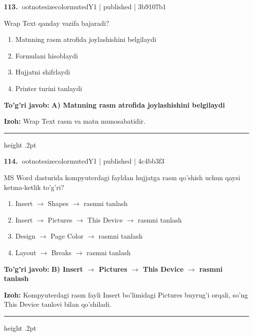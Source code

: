 \documentclass[10pt,a4paper]{article}
\begin{document}
\textbf{\color{ink}113.} {ootnotesizecolor{muted}Y1 | published | 3b9107b1}
\par
Wrap Text qanday vazifa bajaradi?
\begin{enumerate}[label=\Alph*),leftmargin=9mm]
\item Matnning rasm atrofida joylashishini belgilaydi
\item Formulani hisoblaydi
\item Hujjatni shifrlaydi
\item Printer turini tanlaydi
\end{enumerate}
\begin{tcolorbox}[enhanced,breakable,colback=teal!4,colframe=teal!55!black,boxrule=0.45pt,arc=1.2mm,left=2.8mm,right=2.8mm,top=2mm,bottom=2mm]
\textbf{\color{teal}To'g'ri javob:} \textbf{A) Matnning rasm atrofida joylashishini belgilaydi}
\par\smallskip
\textbf{Izoh:} Wrap Text rasm va matn munosabatidir.
\end{tcolorbox}
\vspace{2mm}\hrule height .2pt\vspace{2mm}

\textbf{\color{ink}114.} {ootnotesizecolor{muted}Y1 | published | 4c4bb3f3}
\par
MS Word dasturida kompyuterdagi fayldan hujjatga rasm qo'shish uchun qaysi ketma-ketlik to'g'ri?
\begin{enumerate}[label=\Alph*),leftmargin=9mm]
\item Insert \ensuremath{\rightarrow} Shapes \ensuremath{\rightarrow} rasmni tanlash
\item Insert \ensuremath{\rightarrow} Pictures \ensuremath{\rightarrow} This Device \ensuremath{\rightarrow} rasmni tanlash
\item Design \ensuremath{\rightarrow} Page Color \ensuremath{\rightarrow} rasmni tanlash
\item Layout \ensuremath{\rightarrow} Breaks \ensuremath{\rightarrow} rasmni tanlash
\end{enumerate}
\begin{tcolorbox}[enhanced,breakable,colback=teal!4,colframe=teal!55!black,boxrule=0.45pt,arc=1.2mm,left=2.8mm,right=2.8mm,top=2mm,bottom=2mm]
\textbf{\color{teal}To'g'ri javob:} \textbf{B) Insert \ensuremath{\rightarrow} Pictures \ensuremath{\rightarrow} This Device \ensuremath{\rightarrow} rasmni tanlash}
\par\smallskip
\textbf{Izoh:} Kompyuterdagi rasm fayli Insert bo'limidagi Pictures buyrug'i orqali, so'ng This Device tanlovi bilan qo'shiladi.
\end{tcolorbox}
\vspace{2mm}\hrule height .2pt\vspace{2mm}
\end{document}
